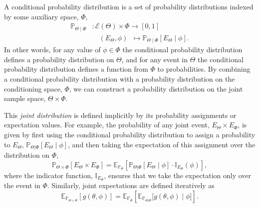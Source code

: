 \documentclass[11pt, oneside]{article}
\newcommand{\PP}{ \mathbb{P} }
\newcommand{\EE}{ \mathbb{E} }
\newcommand{\EV}[1]{\ensuremath { \mathcal{E} \! \left( #1 \right)  } }
\begin{document}
A conditional probability distribution is a set of probability distributions 
indexed by some auxiliary space, $\Phi$,
%
\begin{align*}
\PP_{\Theta \mid \Phi} 
&: \EV{\Theta} \times \Phi \rightarrow \left[0, 1 \right] \\
&\quad \left( E_{\Theta}, \phi \right) \;\; \mapsto 
\PP_{\Theta \mid \Phi} \! \left[ E_{\Theta} \mid \phi \right].
\end{align*}
%
In other words, for any value of $\phi \in \Phi$ the conditional probability
distribution defines a probability distribution on $\Theta$, and for any
event in $\Theta$ the conditional probability distribution defines a 
function from $\Phi$ to probabilities.  By combining a conditional
probability distribution with a probability distribution on the conditioning
space, $\Phi$, we can construct a probability distribution on the joint
sample space, $\Theta \times \Phi$.

This \emph{joint distribution} is defined implicitly by its probability assignments
or expectation values.  For example, the probability of any joint event, 
$E_{\Theta} \times E_{\Phi}$, is given by first using the conditional 
probability distribution to assign a probability to $E_{\Theta}$, 
$\PP_{\Theta|\Phi} \! \left[ E_{\Theta} \mid \phi \right]$, and then 
taking the expectation of this assignment over the distribution on $\Phi$,
%
\begin{equation*}
\PP_{\Theta \times \Phi} \! \left[ E_{\Theta} \times E_{\Phi} \right]
=
\mathbb{E}_{\PP_{\Phi}} \! \left[  
\PP_{\Theta|\Phi} \! \left[ E_{\Theta} \mid \phi \right] 
\cdot \mathbb{I}_{E_{\Phi}} \! \left( \phi \right)
\right],
\end{equation*}
%
where the indicator function, $\mathbb{I}_{E_{\Phi}}$, ensures that we 
take the expectation only over the event in $\Phi$.  Similarly, joint 
expectations are defined iteratively as
%
\begin{equation*}
\EE_{\PP_{\Theta \times \Phi}} \! \left[ g \! \left( \theta, \phi \right) \right]
=
\mathbb{E}_{\PP_{\Phi}} \! \left[  
\EE_{\PP_{\Theta|\Phi}} \! \Big[ 
g \! \left( \theta, \phi \right) \mid \phi 
\Big]
\right].
\end{equation*}
\end{document}
